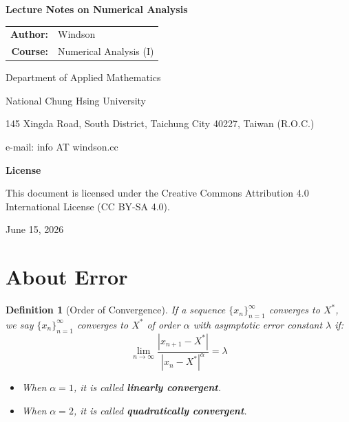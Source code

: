 \documentclass[12pt, a4paper]{article}
\theoremstyle{break}
\newtheorem{definition}{Definition}[section]
\begin{document}
\begin{titlepage}
    \begin{center}
        \vspace*{2cm}
        {\LARGE \bfseries Lecture Notes on Numerical Analysis \par}
        \vspace{3cm}
        \begin{tabular}{rl}
            \textbf{Author:} & Windson \\
            \textbf{Course:} & Numerical Analysis (I) \\
        \end{tabular}
        \vspace{1.5cm} 
        
        {\large Department of Applied Mathematics \par}
        {\large National Chung Hsing University \par}
        \vspace{0.3cm}
        145 Xingda Road, South District, Taichung City 40227, Taiwan (R.O.C.) \par
        e-mail: info AT windson.cc 
        
        \vfill

        {\large \textbf{License} \par}
        {\small This document is licensed under the Creative Commons Attribution 4.0 International License (CC BY-SA 4.0).\par}
        \vspace{1cm}
        {\large June 15, 2026 \par}
    \end{center}
\end{titlepage}
\tableofcontents
\clearpage
{}
\setcounter{page}{1}


\section{About Error}

\begin{definition}[Order of Convergence]
If a sequence $\{x_n\}_{n=1}^{\infty}$ converges to $X^*$, we say $\{x_n\}_{n=1}^{\infty}$ converges to $X^*$ of order $\alpha$ with asymptotic error constant $\lambda$ if:
\[ \lim_{n \rightarrow \infty} \frac{|x_{n+1} - X^*|}{|x_n - X^*|^\alpha} = \lambda \]
\begin{itemize}
    \item When $\alpha = 1$, it is called \textbf{linearly convergent}.
    \item When $\alpha = 2$, it is called \textbf{quadratically convergent}.
\end{itemize}
\end{definition}
\end{document}
